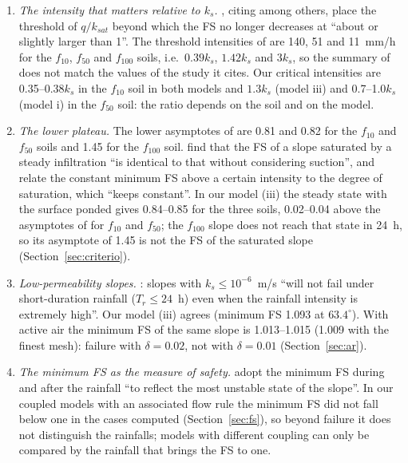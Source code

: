 \begin{enumerate}
\item \emph{The intensity that matters relative to $k_s$.} \citet[p.~14]{liu2021}, citing \citet{rahardjo2007} among
others, place the threshold of $q/k_{sat}$ beyond which the FS no longer decreases at ``about or slightly larger
than 1''. The threshold intensities of \citet[p.~1539 and Fig.~7]{rahardjo2007} are 140, 51 and 11~mm/h for the
$f_{10}$, $f_{50}$ and $f_{100}$ soils, i.e.\ $0.39k_s$, $1.42k_s$ and $3k_s$, so the summary of \citet{liu2021} does
not match the values of the study it cites. Our critical intensities are 0.35--0.38$k_s$ in the $f_{10}$ soil in
both models and $1.3k_s$ (model iii) and 0.7--1.0$k_s$ (model i) in the $f_{50}$ soil: the ratio depends on the
soil and on the model.

\item \emph{The lower plateau.} The lower asymptotes of \citet[Fig.~7]{rahardjo2007} are 0.81 and 0.82 for the
$f_{10}$ and $f_{50}$ soils and 1.45 for the $f_{100}$ soil. \citet[p.~9]{li2024} find that the FS of a slope
saturated by a steady infiltration ``is identical to that without considering suction'', and
\citet[p.~17]{cheng2024} relate the constant minimum FS above a certain intensity to the degree of saturation, which
``keeps constant''. In our model (iii) the steady state with the surface ponded gives 0.84--0.85 for the three soils,
0.02--0.04 above the asymptotes of \citet{rahardjo2007} for $f_{10}$ and $f_{50}$; the $f_{100}$ slope does not reach
that state in 24~h, so its asymptote of 1.45 is not the FS of the saturated slope (Section~\ref{sec:criterio}).

\item \emph{Low-permeability slopes.} \citet[p.~1541]{rahardjo2007}: slopes with $k_s\le10^{-6}$~m/s ``will not fail
under short-duration rainfall ($T_r\le24$~h) even when the rainfall intensity is extremely high''. Our model (iii)
agrees (minimum FS 1.093 at $63.4^\circ$). With active air the minimum FS of the same slope is 1.013--1.015 (1.009 with
the finest mesh): failure with $\delta=0.02$, not with $\delta=0.01$ (Section~\ref{sec:ar}).

\item \emph{The minimum FS as the measure of safety.} \citet[p.~324]{tang2018} adopt the minimum FS during and after
the rainfall ``to reflect the most unstable state of the slope''. In our coupled models with an associated flow rule
the minimum FS did not fall below one in the cases computed (Section~\ref{sec:fs}), so beyond failure it does not distinguish the
rainfalls; models with different coupling can only be compared by the rainfall that brings the FS to one.
\end{enumerate}
